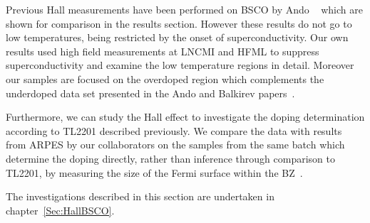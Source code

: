 Previous Hall measurements have been performed on \ac{BSCO} by Ando \etal~\cite{Ando1999, Ando2000} which are shown for comparison in the results section. However these results do not go to low temperatures, being restricted by the onset of superconductivity. Our own results used high field measurements at \ac{LNCMI} and \ac{HFML} to suppress superconductivity and examine the low temperature regions in detail. Moreover our samples are focused on the overdoped region which complements the underdoped data set presented in the Ando and Balkirev papers~\cite{Balakirev2003}.

Furthermore, we can study the Hall effect to investigate the doping determination according to \ac{TL2201} described previously. We compare the data with results from \ac{ARPES} by our collaborators on the samples from the same batch which determine the doping directly, rather than inference through comparison to \ac{TL2201}, by measuring the size of the Fermi surface within the \ac{BZ}~\cite{Kondo2004}.

The investigations described in this section are undertaken in chapter~\ref{Sec:HallBSCO}.


